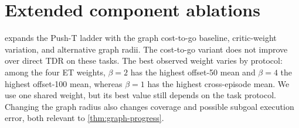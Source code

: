 \documentclass{article}
\theoremstyle{definition}
\theoremstyle{remark}
\begin{document}
\section{Extended component ablations}
\label{app:ablation}
 expands the Push-T ladder with the graph cost-to-go baseline,
critic-weight variation, and alternative graph radii. The cost-to-go variant does
not improve over direct TDR on these tasks. The best observed weight varies by protocol:
among the four ET weights, $\beta=2$ has the highest offset-50 mean and $\beta=4$
the highest offset-100 mean, whereas $\beta=1$ has the highest cross-episode mean.
We use one shared weight, but its best value still depends on the task protocol.
Changing the graph radius also changes coverage and possible subgoal execution error,
both relevant to \cref{thm:graph-progress}.
\end{document}
